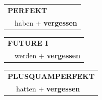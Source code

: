 \documentclass[10pt,a4paper]{revtex4-2}
\begin{document}
\begin{verbbox-acc}
    \vspace{10pt}

 \begin{tabular}{rl}
     \multicolumn{2}{l}{\textbf{PERFEKT}}\\
  &  haben + \textbf{vergessen}\\
  \end{tabular}
\hfill
   \begin{tabular}{rl}
   
    \multicolumn{2}{l}{\textbf{FUTURE I} }\\
  &  werden + \textbf{vergessen}\\
 
  \end{tabular}
\hfill
   \begin{tabular}{rl}
      \multicolumn{2}{l}{\textbf{PLUSQUAMPERFEKT}}\\
  &  hatten + \textbf{vergessen}\\
  \end{tabular}
  
  \vspace{-5pt}


\end{verbbox-acc}
\end{document}
